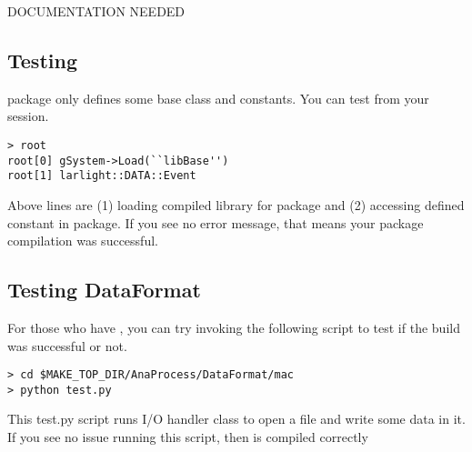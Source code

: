 DOCUMENTATION NEEDED

\subsection{Testing \Base}

\Base package only defines some base class and constants. 
You can test from your \CINT session.
\begin{lstlisting}
> root
root[0] gSystem->Load(``libBase'')
root[1] larlight::DATA::Event
\end{lstlisting}
Above lines are (1) loading compiled library for \Base package and (2) accessing defined constant in \Base package.
If you see no error message, that means your \Base package compilation was successful.

\subsection{Testing DataFormat}
For those who have \PyROOT, you can try invoking the following script to test if the build was successful or not.

\begin{lstlisting}
> cd $MAKE_TOP_DIR/AnaProcess/DataFormat/mac
> python test.py
\end{lstlisting}

This {\ttfamily test.py} script runs I/O handler class to open a \ROOT file and write some data in it.
If you see no issue running this script, then \DataFormat is compiled correctly
